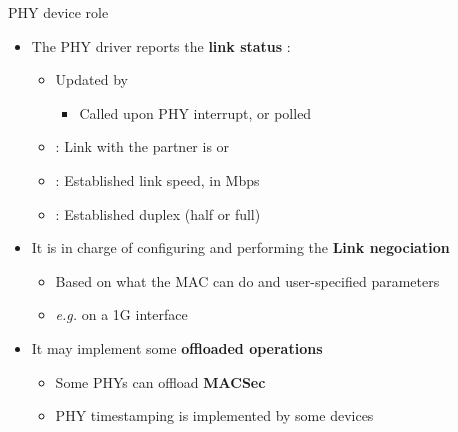 \begin{frame}{PHY device role}
	\begin{itemize}
		\item The PHY driver reports the \textbf{link status} :
			\begin{itemize}
				\item Updated by 
					\begin{itemize}
						\item Called upon PHY interrupt, or polled
					\end{itemize}
				\item {} : Link with the partner is  or 
				\item {} : Established link speed, in Mbps
				\item {} : Established duplex (half or full)
			\end{itemize}
		\item It is in charge of configuring and performing the \textbf{Link negociation}
			\begin{itemize}
				\item Based on what the MAC can do and user-specified parameters
				\item \textit{e.g.}  on a 1G interface
			\end{itemize}
		\item It may implement some \textbf{offloaded operations}
			\begin{itemize}
				\item Some PHYs can offload \textbf{MACSec}
				\item PHY timestamping is implemented by some devices
			\end{itemize}
	\end{itemize}
\end{frame}

